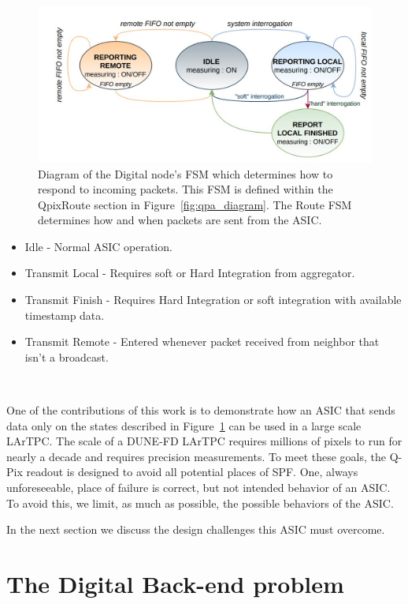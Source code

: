 \begin{figure}[]
\centering
\includegraphics[width=\textwidth]{images/digital_fsm_overview.jpg}
\caption{Diagram of the Digital node's FSM which determines how to respond to incoming packets.
This FSM is defined within the QpixRoute section in Figure~\ref{fig:qpa_diagram}.
The Route FSM determines how and when packets are sent from the ASIC.
}
\label{fig:digital_fsm}
\end{figure}

\begin{itemize}
    \item Idle - Normal ASIC operation.
    \item Transmit Local - Requires soft or Hard Integration from aggregator.
    \item Transmit Finish - Requires Hard Integration or soft integration with available timestamp data.
    \item Transmit Remote - Entered whenever packet received from neighbor that isn't a broadcast.
\end{itemize}~\label{fsm_state_labels}

One of the contributions of this work is to demonstrate how an ASIC that sends data only on the states described in Figure~\ref{fig:digital_fsm} can be used in a large scale LArTPC.
The scale of a DUNE-FD LArTPC requires millions of pixels to run for nearly a decade and requires precision measurements.
To meet these goals, the Q-Pix readout is designed to avoid all potential places of SPF.
One, always unforeseeable, place of failure is correct, but not intended behavior of an ASIC.
To avoid this, we limit, as much as possible, the possible behaviors of the ASIC.

In the next section we discuss the design challenges this ASIC must overcome.

\section{The Digital Back-end problem}~\label{sec:digital_problem}

